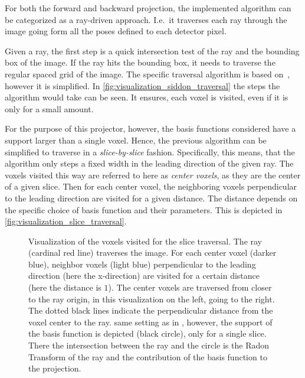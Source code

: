 For both the forward and backward projection, the implemented algorithm can be categorized as a
ray-driven approach. I.e.\ it traverses each ray through the image going form all the poses defined
to each detector pixel.

Given a ray, the first step is a quick intersection test of the ray and the bounding box of the
image. If the ray hits the bounding box, it needs to traverse the regular spaced grid of the image.
The specific traversal algorithm is based on~\cite{amanatides_fast_1987}, however it is simplified.
In \autoref{fig:visualization_siddon_traversal} the steps the algorithm would take can be seen. It
ensures, each voxel is visited, even if it is only for a small amount.

For the purpose of this projector, however, the basis functions considered have a support larger
than a single voxel. Hence, the previous algorithm can be simplified to traverse in a
\textit{slice-by-slice} fashion. Specifically, this means, that the algorithm only steps a fixed
width in the leading direction of the given ray. The voxels visited this way are referred to here as
\textit{center voxels}, as they are the center of a given slice. Then for each center voxel, the
neighboring voxels perpendicular to the leading direction are visited for a given distance. The
distance depends on the specific choice of basis function and their parameters. This is depicted in
\autoref{fig:visualization_slice_traversal}.

\begin{figure}[h]
	\centering
	\caption{ Visualization of the voxels visited
		for the slice traversal. The ray (cardinal red line) traverses the image. For each
		center voxel (darker blue), neighbor voxels (light blue) perpendicular to the
		leading direction (here the x-direction) are visited for a certain distance (here
		the distance is \(1\)). The center voxels are traversed from closer to the ray
		origin, in this visualization on the left, going to the right. The dotted black
		lines indicate the perpendicular distance from the voxel center to the ray.
		 same setting as in
		, however, the support of the basis function is
		depicted (black circle), only for a single slice. There the intersection between the
		ray and the circle is the Radon Transform of the ray and the contribution of the
		basis function to the projection.
	}\label{fig:visualization_slice_traversal}
\end{figure}

